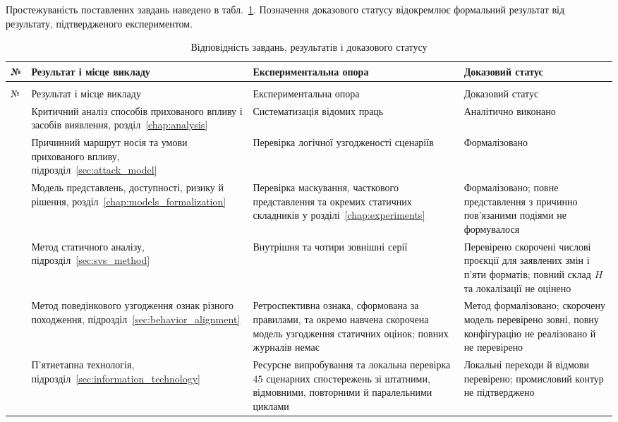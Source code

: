 Простежуваність поставлених завдань наведено в табл.~\ref{tab:intro_traceability}. Позначення доказового статусу відокремлює формальний результат від результату, підтвердженого експериментом.

\begin{longtable}{@{}>{\centering\arraybackslash}p{}p{}p{}p{}@{}}
\caption{Відповідність завдань, результатів і доказового статусу}\label{tab:intro_traceability}\\
\toprule
№ & Результат і місце викладу & Експериментальна опора & Доказовий статус \\
\midrule
\endfirsthead
\multicolumn{4}{l}{Продовження таблиці \thetable}\\
\toprule
№ & Результат і місце викладу & Експериментальна опора & Доказовий статус \\
\midrule
\endhead
\bottomrule
\endfoot
1 & Критичний аналіз способів прихованого впливу і засобів виявлення, розділ~\ref{chap:analysis} & Систематизація відомих праць & Аналітично виконано \\
2 & Причинний маршрут носія та умови прихованого впливу, підрозділ~\ref{sec:attack_model} & Перевірка логічної узгодженості сценаріїв & Формалізовано \\
3 & Модель представлень, доступності, ризику й рішення, розділ~\ref{chap:models_formalization} & Перевірка маскування, часткового представлення та окремих статичних складників у розділі~\ref{chap:experiments} & Формалізовано; повне представлення з причинно пов’язаними подіями не формувалося \\
4 & Метод статичного аналізу, підрозділ~\ref{sec:svs_method} & Внутрішня та чотири зовнішні серії & Перевірено скорочені числові проєкції для заявлених змін і п’яти форматів; повний склад $H$ та локалізації не оцінено \\
5 & Метод поведінкового узгодження ознак різного походження, підрозділ~\ref{sec:behavior_alignment} & Ретроспективна ознака, сформована за правилами, та окремо навчена скорочена модель узгодження статичних оцінок; повних журналів немає & Метод формалізовано; скорочену модель перевірено зовні, повну конфігурацію не реалізовано й не перевірено \\
6 & П’ятиетапна технологія, підрозділ~\ref{sec:information_technology} & Ресурсне випробування та локальна перевірка $45$ сценарних спостережень зі штатними, відмовними, повторними й паралельними циклами & Локальні переходи й відмови перевірено; промисловий контур не підтверджено \\

\end{longtable}
